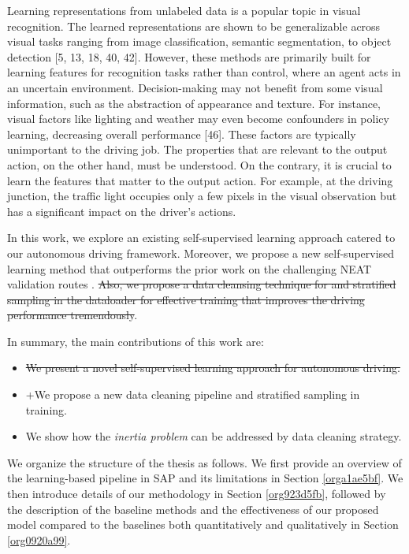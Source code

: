 \documentclass[letterpaper, 12pt]{article}
\theoremstyle{definition}
\theoremstyle{definition}
\theoremstyle{definition}
\theoremstyle{definition}
\theoremstyle{definition}
\begin{document}
Learning representations from unlabeled data is a popular topic in visual
recognition. The learned representations are shown to be generalizable across
visual tasks ranging from image classification, semantic segmentation, to object
detection [5, 13, 18, 40, 42]. However, these methods are primarily built for
learning features for recognition tasks rather than control, where an agent acts
in an uncertain environment. Decision-making may not benefit from some visual
information, such as the abstraction of appearance and texture. For instance,
visual factors like lighting and weather may even become confounders in policy
learning, decreasing overall performance [46]. These factors are typically
unimportant to the driving job. The properties that are relevant to the output
action, on the other hand, must be understood.
On the contrary, it is crucial
to learn the features that matter to the output action. For example, at the
driving junction, the traffic light occupies only a few pixels in the visual
observation but has a significant impact on the driver’s actions.

In this work, we explore an existing self-supervised learning approach catered
to our autonomous driving framework. Moreover, we propose a new self-supervised
learning method that outperforms the prior work on the challenging NEAT
validation routes \cite{Chitta2021}. \sout{Also, we propose a data cleansing
technique for and stratified sampling in the dataloader for effective training
that improves the driving performance tremendously}.



In summary, the main contributions of this work are:
\begin{itemize}
\item \sout{We present a novel self-supervised learning approach for autonomous driving.}
\item +We propose a new data cleaning pipeline and stratified sampling in training.
\item We show how the \emph{inertia problem} can be addressed by data cleaning strategy.
\end{itemize}

We organize the structure of the thesis as follows. We first provide an overview
of the learning-based pipeline in SAP and its limitations in Section \ref{orga1ae5bf}. We
then introduce details of our methodology in Section \ref{org923d5fb}, followed by the
description of the baseline methods and the effectiveness of our proposed model
compared to the baselines both quantitatively and qualitatively in Section
\ref{org0920a99}.
\end{document}
